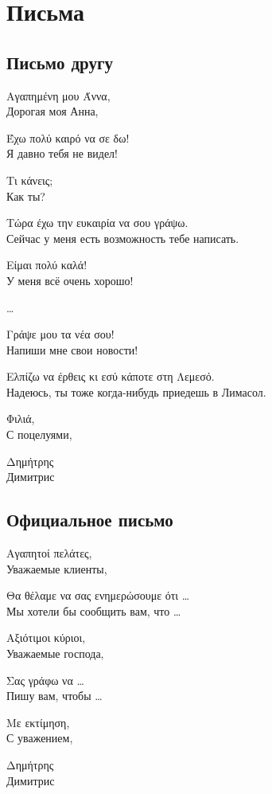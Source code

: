 \documentclass[12pt]{article}
\newcommand{\my}[1]{\textcolor{gray!80!white}{#1}}
\newenvironment{page}{\clearpage\normalsize\null\vfill}{\vfill\null}
\newenvironment{textblock}{\begin{minipage}{\textwidth}}{\end{minipage}\smallskip}
\begin{document}
	\begin{page}
		\section{Письма}

		\subsection{Письмо другу}
		\begin{textblock}
			\small
			Αγαπημένη μου Άννα,\\
			\my{Дорогая моя Анна,}
			
			Έχω πολύ καιρό να σε δω!\\
			\my{Я давно тебя не видел!}
			
			Τι κάνεις;\\
			\my{Как ты?}
			
			Τώρα έχω την ευκαιρία να σου γράψω.\\
			\my{Сейчас у меня есть возможность тебе написать.}
			
			Είμαι πολύ καλά!\\
			\my{У меня всё очень хорошо!}
			
			\dots
			
			
			Γράψε μου τα νέα σου!\\
			\my{Напиши мне свои новости!}
			
			Ελπίζω να έρθεις κι εσύ κάποτε στη Λεμεσό.\\
			\my{Надеюсь, ты тоже когда-нибудь приедешь в Лимасол.}
			
			Φιλιά,\\
			\my{С поцелуями,}
			
			Δημήτρης\\
			\my{Димитрис}
		\end{textblock}
	\end{page}
	
	\begin{page}
		\subsection{Официальное письмо}
		\begin{textblock}
			Αγαπητοί πελάτες,\\
			\my{Уважаемые клиенты,}
			
			Θα θέλαμε να σας ενημερώσουμε ότι \dots\\
			\my{Мы хотели бы сообщить вам, что \dots}
			
			Αξιότιμοι κύριοι,\\
			\my{Уважаемые господа,}
			
			Σας γράφω να \dots\\
			\my{Пишу вам, чтобы \dots}
			
			Με εκτίμηση,\\
			\my{С уважением,}
			
			Δημήτρης\\
			\my{Димитрис}
		\end{textblock}
	\end{page}
	
\end{document}
